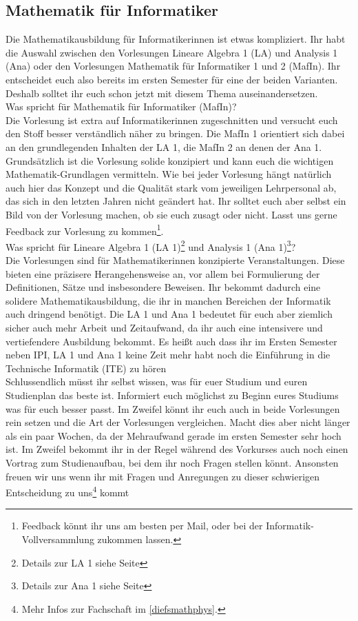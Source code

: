 \subsection{Mathematik für Informatiker}

Die Mathematikausbildung für Informatikerinnen ist etwas kompliziert. Ihr habt die Auswahl zwischen den Vorlesungen Lineare Algebra 1 (\gls{LA}) und Analysis 1 (\gls{Ana}) oder den Vorlesungen Mathematik für Informatiker 1 und 2 (\gls{MafIn}). Ihr entscheidet euch also bereits im ersten Semester für eine der beiden Varianten. Deshalb solltet ihr euch schon jetzt mit diesem Thema auseinandersetzen.\\

Was spricht für Mathematik für Informatiker (MafIn)?\\
Die Vorlesung ist extra auf Informatikerinnen zugeschnitten und versucht euch den Stoff besser verständlich näher zu bringen. Die MafIn 1 orientiert sich dabei an den grundlegenden Inhalten der LA 1, die MafIn 2 an denen der Ana 1. Grundsätzlich ist die Vorlesung solide konzipiert und kann euch die wichtigen Mathematik-Grundlagen vermitteln. Wie bei jeder Vorlesung hängt natürlich auch hier das Konzept und die Qualität stark vom jeweiligen Lehrpersonal ab, das sich in den letzten Jahren nicht geändert hat. Ihr solltet euch aber selbst ein Bild von der Vorlesung machen, ob sie euch zusagt oder nicht. Lasst uns gerne Feedback zur Vorlesung zu kommen\footnote{Feedback könnt ihr uns am besten per Mail, oder bei der Informatik-Vollversammlung zukommen lassen.}.\\

Was spricht für Lineare Algebra 1 (LA 1)\footnote{Details zur LA 1 siehe Seite \pageref{la1}} und Analysis 1 (Ana 1)\footnote{Details zur Ana 1 siehe Seite \pageref{ana1}}?\\
Die Vorlesungen sind für Mathematikerinnen konzipierte Veranstaltungen. Diese bieten eine präzisere Herangehensweise an, vor allem bei Formulierung der Definitionen, Sätze und insbesondere Beweisen. Ihr bekommt dadurch eine solidere Mathematikausbildung, die ihr in manchen Bereichen der Informatik auch dringend benötigt. Die LA 1 und Ana 1 bedeutet für euch aber ziemlich sicher auch mehr Arbeit und Zeitaufwand, da ihr auch eine intensivere und vertiefendere Ausbildung bekommt. Es heißt auch dass ihr im Ersten Semester neben \gls{IPI}, LA 1 und Ana 1 keine Zeit mehr habt noch die Einführung in die Technische Informatik (\gls{ITE}) zu hören\\

Schlussendlich müsst ihr selbst wissen, was für euer Studium und euren Studienplan das beste ist. Informiert euch möglichst zu Beginn eures Studiums was für euch besser passt. Im Zweifel könnt ihr euch auch in beide Vorlesungen rein setzen und die Art der Vorlesungen vergleichen. Macht dies aber nicht länger als ein paar Wochen, da der Mehraufwand gerade im ersten Semester sehr hoch ist. Im Zweifel bekommt ihr in der Regel während des Vorkurses auch noch einen Vortrag zum Studienaufbau, bei dem ihr noch Fragen stellen könnt. Ansonsten freuen wir uns wenn ihr mit Fragen und Anregungen zu dieser schwierigen Entscheidung zu uns\footnote{Mehr Infos zur Fachschaft im \autoref{diefsmathphys}.} kommt
